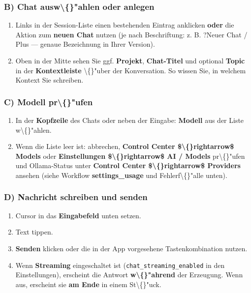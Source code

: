 \subsubsection{B) Chat ausw\textbackslash\{\}"ahlen oder anlegen}

\begin{enumerate}
\item Links in der Session-Liste einen bestehenden Eintrag anklicken \textbf{oder} die Aktion zum \textbf{neuen Chat} nutzen (je nach Beschriftung: z. B. ?Neuer Chat\texttt{} / Plus --- genaue Bezeichnung in Ihrer Version).
\item Oben in der Mitte sehen Sie ggf. \textbf{Projekt}, \textbf{Chat-Titel} und optional \textbf{Topic} in der \textbf{Kontextleiste} \textbackslash\{\}"uber der Konversation. So wissen Sie, in welchem Kontext Sie schreiben.
\end{enumerate}

\subsubsection{C) Modell pr\textbackslash\{\}"ufen}

\begin{enumerate}
\item In der \textbf{Kopfzeile} des Chats oder neben der Eingabe: \textbf{Modell} aus der Liste w\textbackslash\{\}"ahlen.
\item Wenn die Liste leer ist: abbrechen, \textbf{Control Center \$\textbackslash\{\}rightarrow\$ Models} oder \textbf{Einstellungen \$\textbackslash\{\}rightarrow\$ AI / Models} pr\textbackslash\{\}"ufen und Ollama-Status unter \textbf{Control Center \$\textbackslash\{\}rightarrow\$ Providers} ansehen (siehe Workflow \textbf{settings\_usage} und Fehlerf\textbackslash\{\}"alle unten).
\end{enumerate}

\subsubsection{D) Nachricht schreiben und senden}

\begin{enumerate}
\item Cursor in das \textbf{Eingabefeld} unten setzen.
\item Text tippen.
\item \textbf{Senden} klicken oder die in der App vorgesehene Tastenkombination nutzen.
\item Wenn \textbf{Streaming} eingeschaltet ist (\texttt{chat\_streaming\_enabled} in den Einstellungen), erscheint die Antwort \textbf{w\textbackslash\{\}"ahrend} der Erzeugung. Wenn aus, erscheint sie \textbf{am Ende} in einem St\textbackslash\{\}"uck.
\end{enumerate}

